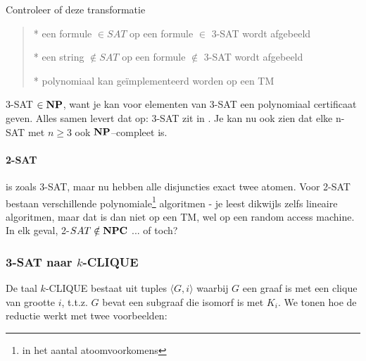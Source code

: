 Controleer of deze transformatie
\begin{verse}
* een formule $\in SAT$ op een formule $ \in$ 3-SAT wordt afgebeeld

* een string $\notin SAT$ op een formule $ \notin$ 3-SAT wordt afgebeeld

* polynomiaal kan ge\"implementeerd worden op een TM 
\end{verse}

3-SAT $\in {\bf NP}$, want je kan voor elementen van 3-SAT een polynomiaal
certificaat geven. Alles samen levert dat op: 3-SAT zit in \NPC. Je
kan nu ook zien dat elke n-SAT met $n \geq 3$ ook ${\bf NP}$--compleet is.

\paragraph{2-SAT} is zoals 3-SAT, maar nu hebben alle disjuncties
exact twee atomen. Voor 2-SAT bestaan verschillende
polynomiale\footnote{in het aantal atoomvoorkomens} algoritmen - je
leest dikwijls zelfs lineaire algoritmen, maar dat is dan niet op een
TM, wel op een random access machine. In elk geval, 2-$SAT \notin {\bf NPC}$ ... of toch?


\subsubsection{3-SAT naar $k$-CLIQUE}

De taal $k$-CLIQUE bestaat uit tuples $\langle G,i \rangle$ waarbij $G$ een graaf is
met een clique van grootte $i$, t.t.z. $G$ bevat een subgraaf die
isomorf is met $K_i$. We tonen hoe de reductie werkt met twee
voorbeelden:

